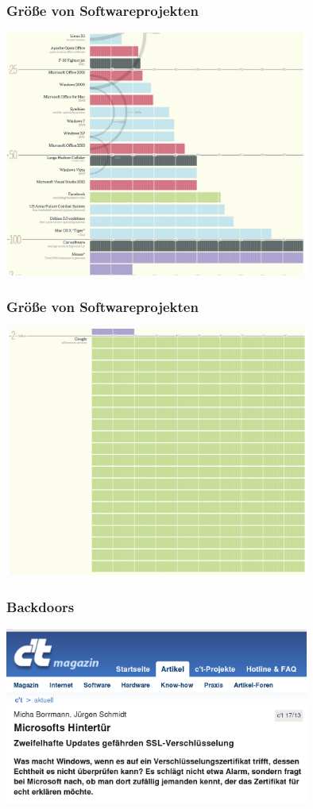 \documentclass[12pt, xcolor={svgnames,table}]{beamer}
\begin{document}
\begin{frame}
  \frametitle{Größe von Softwareprojekten}
  \begin{center}
    \includegraphics[width=10cm]{img/linesofcode.png}
  \par\end{center}
\end{frame}

\begin{frame}
  \frametitle{Größe von Softwareprojekten}
  \begin{center}
    \includegraphics[width=10cm]{img/linesofcode-google.png}
  \par\end{center}
\end{frame}

\begin{frame}
  \frametitle{Backdoors}
  \begin{center}
    \includegraphics[width=10cm]{img/backdoor-windows}
  \par\end{center}
\end{frame}
\end{document}

